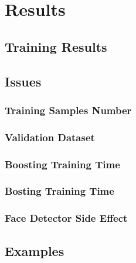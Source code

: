 \section{Results}


\subsection{Training Results}


\subsection{Issues}

\subsubsection*{Training Samples Number}

\subsubsection*{Validation Dataset}

\subsubsection*{Boosting Training Time}

\subsubsection*{Bosting Training Time}

\subsubsection*{Face Detector Side Effect}


\subsection{Examples}


